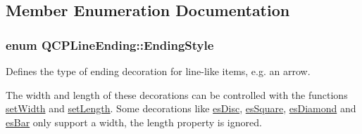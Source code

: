 \subsection{Member Enumeration Documentation}
\subsubsection[{\texorpdfstring{Ending\+Style}{EndingStyle}}]{\setlength{\rightskip}{0pt plus 5cm}enum {\bf Q\+C\+P\+Line\+Ending\+::\+Ending\+Style}}\hypertarget{classQCPLineEnding_a5ef16e6876b4b74959c7261d8d4c2cd5}{}\label{classQCPLineEnding_a5ef16e6876b4b74959c7261d8d4c2cd5}
Defines the type of ending decoration for line-\/like items, e.\+g. an arrow.



The width and length of these decorations can be controlled with the functions \hyperlink{classQCPLineEnding_a26dc020ea985a72cc25881ce2115e34e}{set\+Width} and \hyperlink{classQCPLineEnding_ae36fa01763751cd64b7f56c3507e935a}{set\+Length}. Some decorations like \hyperlink{classQCPLineEnding_a5ef16e6876b4b74959c7261d8d4c2cd5ae5a3414916817258bcc6dddd605e8f5c}{es\+Disc}, \hyperlink{classQCPLineEnding_a5ef16e6876b4b74959c7261d8d4c2cd5ae1836502fa43d8990bb62b2d493a140a}{es\+Square}, \hyperlink{classQCPLineEnding_a5ef16e6876b4b74959c7261d8d4c2cd5a378fe5a8b768411b0bc1765210fe7200}{es\+Diamond} and \hyperlink{classQCPLineEnding_a5ef16e6876b4b74959c7261d8d4c2cd5a2cf543bbca332df26d89bf779f50469f}{es\+Bar} only support a width, the length property is ignored.

